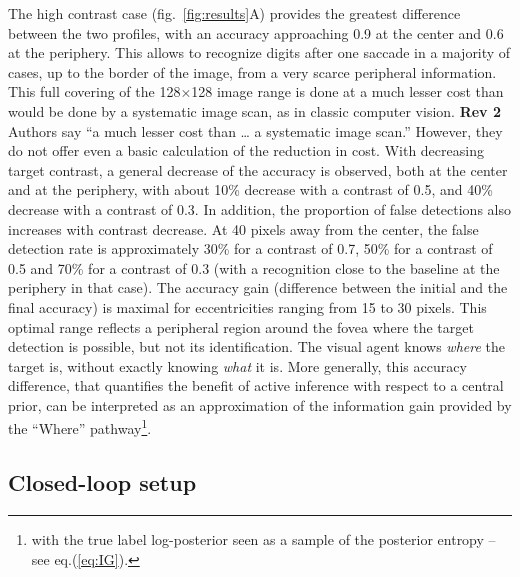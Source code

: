 The high contrast case (fig.~\ref{fig:results}A) provides the greatest difference between the two profiles, with an accuracy approaching 0.9 at the center and 0.6 at the periphery. This allows to recognize digits after one saccade in a majority of cases, up to the border of the image, from a very scarce peripheral information. This full covering of the 128$\times$128 image range is done at a much lesser cost than would be done by a systematic image scan, as in classic computer vision.
{\color{red} \textbf{Rev 2} Authors say “a much lesser cost than … a systematic image scan.” However, they do not offer even a basic calculation of the reduction in cost.
}
With decreasing target contrast, a general decrease of the accuracy is observed, both at the center and at the periphery, with about 10\% decrease with a contrast of 0.5, and 40\% decrease with a contrast of 0.3. In addition, the proportion of false detections also increases with contrast decrease. At 40 pixels away from the center, the false detection rate is approximately 30\% for a contrast of 0.7, 50\% for a contrast of 0.5 and 70\% for a contrast of 0.3 (with a recognition close to the baseline at the periphery in that case). The accuracy gain (difference between the initial and the final accuracy) is maximal for eccentricities ranging from 15 to 30 pixels. This optimal range reflects a peripheral region around the fovea where the target detection is possible, but not its identification. The visual agent knows \emph{where} the target is, without exactly knowing \emph{what} it is.
More generally, this accuracy difference, that quantifies the benefit of active inference with respect to a central prior, can be interpreted as an approximation of the information gain provided by the ``Where'' pathway\footnote{with the true label log-posterior seen as a sample of the posterior entropy -- see eq.(\ref{eq:IG}).}.





\subsection{Closed-loop setup}

